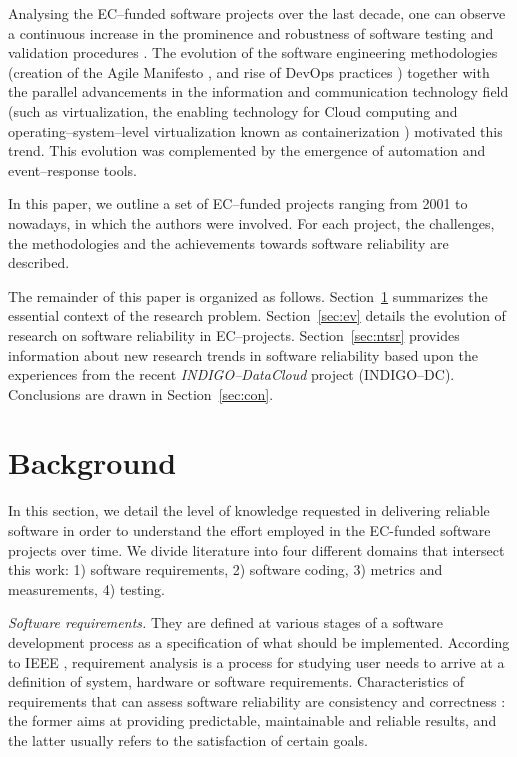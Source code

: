 \documentclass[journal]{IEEEtran}
\begin{document}
Analysing the EC--funded software projects over the last decade,
one can observe a continuous increase in the prominence and robustness of software
testing and validation procedures \cite{aiftimiei}. The
evolution of the software engineering methodologies (creation of the Agile
Manifesto \cite{agile-manifesto}, and rise of DevOps practices \cite{zhu}) together
with the parallel advancements in the information and communication technology
field (such as virtualization, the enabling technology for Cloud computing and
operating--system--level virtualization known as containerization \cite{soltesz}) motivated this trend.
This evolution was complemented by the emergence of automation and event--response tools.

In this paper, we outline a set of EC--funded projects
ranging from 2001 to nowadays, in which the authors were involved.
For each project, the challenges, the methodologies and
the achievements towards software reliability are described.

The remainder of this paper is
organized as follows. Section~\ref{sec:b} summarizes the essential context of the research problem.
Section~\ref{sec:ev} details the evolution of research on
software reliability in EC--projects. Section~\ref{sec:ntsr} provides
information about new research trends in software reliability based upon the
experiences from the recent {\sl INDIGO--DataCloud} project (INDIGO--DC).
Conclusions are drawn in Section~\ref{sec:con}.

\section{Background}
\label{sec:b}

In this section, we detail the level of knowledge requested in delivering reliable software in order 
to understand the effort employed in the EC-funded software projects over time. We divide literature 
into four different domains that intersect this work: 1) software requirements, 2) software coding,
3) metrics and measurements, 4) testing.

\emph{Software requirements.} They are defined at various stages of a software development process
as a specification of what should be implemented. According to IEEE \cite{radatz}, requirement
analysis is a process for studying user needs to arrive at a definition of system, hardware or software
requirements. Characteristics of requirements that can assess software reliability are consistency and
correctness \cite{sommerville}: the former aims at providing predictable, maintainable and reliable
results, and the latter usually refers to the satisfaction of certain goals.
\end{document}
